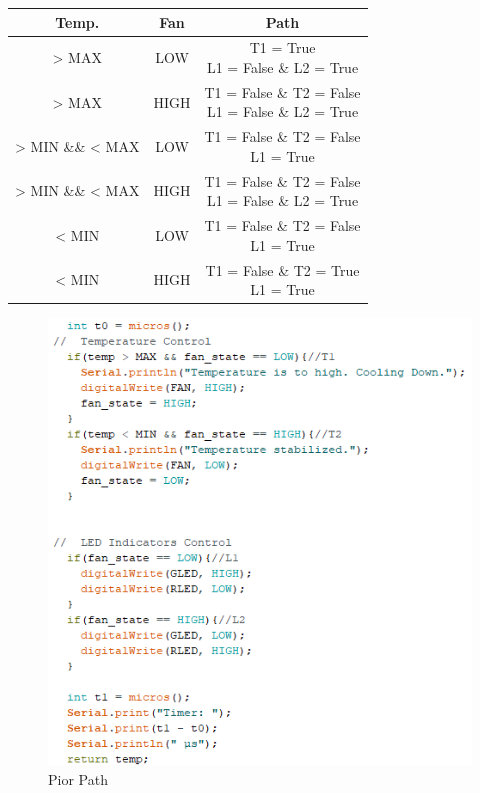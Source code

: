 \begin{table}[H]
    \centering
    \begin{tabular}{|c|c|c|}
        \hline
        \multicolumn{1}{|c|}{Temp.} & 
        \multicolumn{1}{|c|}{Fan} & 
        \multicolumn{1}{|c|}{Path}\\
        \hline
        > MAX & LOW & \makecell{T1 = True \\ L1 = False \& L2 = True}\\
        \hline
        > MAX & HIGH & \makecell{T1 = False \& T2 = False \\ L1 = False \& L2 = True}\\
        \hline
        > MIN \&\& < MAX & LOW & \makecell{T1 = False \& T2 = False \\ L1 = True}\\
        \hline
        > MIN \&\& < MAX & HIGH & \makecell{T1 = False \& T2 = False \\ L1 = False \& L2 = True}\\
        \hline
        < MIN & LOW & \makecell{T1 = False \& T2 = False \\ L1 = True}\\
        \hline
        < MIN & HIGH & \makecell{T1 = False \& T2 = True \\ L1 = True}\\
        \hline
    \end{tabular}
\end{table}

\begin{figure}[H]
    \centering
    \includegraphics[scale=0.7]{images/path_worst.png}
    \caption{Pior Path}
    \label{fig:my_label}
\end{figure}

